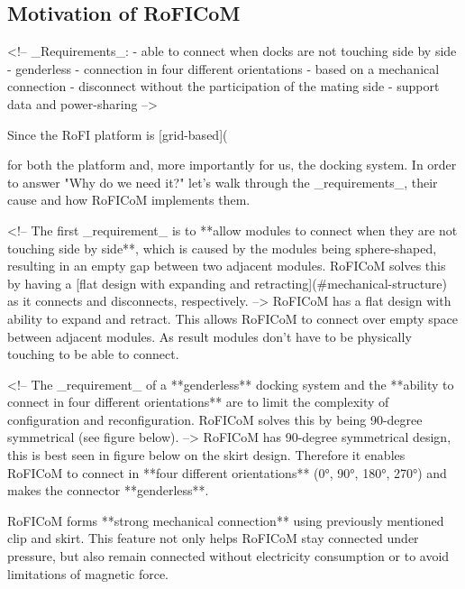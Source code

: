 \documentclass[
  digital,     %
  oneside,     %
  nosansbold,  %
  nocolorbold, %
  lof,         %
  lot,         %
]{fithesis4}
\begin{document}

\iffalse
\subsection{ Motivation of RoFICoM }
<!--
_Requirements_:
- able to connect when docks are not touching side by side
- genderless
- connection in four different orientations
- based on a mechanical connection
- disconnect without the participation of the mating side
- support data and power-sharing
-->

Since the RoFI platform is [grid-based]({%
for both the platform and, more importantly for us, the docking system.
In order to answer "Why do we need it?" let's walk through the _requirements_, their cause and how RoFICoM implements them.

<!-- The first _requirement_ is to **allow modules to connect
when they are not touching side by side**, which is caused by the modules being sphere-shaped, resulting in an empty gap between two adjacent modules. RoFICoM solves this by having a [flat design with expanding and retracting](#mechanical-structure) as it connects and disconnects, respectively. -->
RoFICoM has a flat design with ability to expand and retract. This allows RoFICoM to connect over empty space between
adjacent modules. As result modules don't have to be physically touching to be able to connect.

<!-- The _requirement_ of a **genderless** docking system and the **ability to connect in four different orientations** are to limit the
complexity of configuration and reconfiguration. RoFICoM solves this by being 90-degree symmetrical (see figure below). -->
RoFICoM has 90-degree symmetrical design, this is best seen in figure below on the skirt design. Therefore it enables
RoFICoM to connect in **four different orientations** (0°, 90°, 180°, 270°) and makes the connector **genderless**.

{%

RoFICoM forms **strong mechanical connection** using previously mentioned clip and skirt. This feature not only helps RoFICoM stay connected under pressure, but also remain connected without electricity consumption or to avoid limitations of magnetic force.

}}
\end{document}

